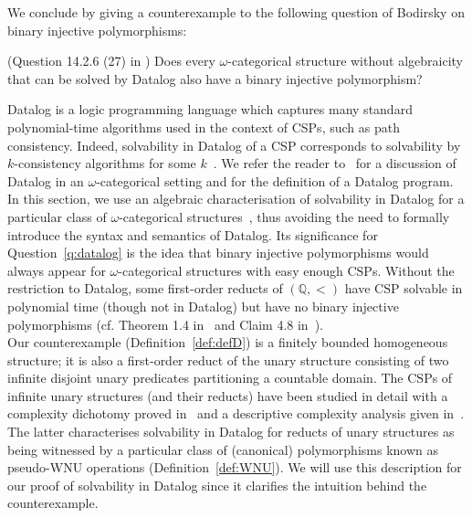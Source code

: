 \documentclass{article}
\theoremstyle{remark}
\theoremstyle{definition}
\newenvironment{customq}[1]
  {\renewcommand\theinnercustomq{#1}\innercustomq}
  {\endinnercustomq}
\begin{document}
We conclude by giving a counterexample to the following question of Bodirsky on binary injective polymorphisms:

\begin{customq}{\ref{q:datalog}}(Question 14.2.6 (27) in {\cite{BodCSP}})
   Does every $\omega$-categorical structure without algebraicity that can be solved
by Datalog also have a binary injective polymorphism?
\end{customq}

  Datalog is a logic programming language which captures many standard polynomial-time algorithms used in the context of CSPs, such as path consistency. Indeed, solvability in Datalog of a CSP corresponds to solvability by $k$-consistency algorithms for some $k$~\cite{feder1998computational, bodirsky2013datalog}. We refer the reader to~\cite{bodirsky2013datalog} for a discussion of Datalog in an $\omega$-categorical setting and for the definition of a Datalog program. In this section, we use an algebraic characterisation of solvability in Datalog for a particular class of $\omega$-categorical structures~\cite{mottet2021symmetries}, thus avoiding the need to formally introduce the syntax and semantics of Datalog. Its significance for Question~\ref{q:datalog} is the idea that binary injective polymorphisms would always appear for $\omega$-categorical structures with easy enough $\mathrm{CSP}$s. Without the restriction to Datalog, some first-order reducts of $(\mathbb{Q}, <)$ have $\mathrm{CSP}$ solvable in polynomial time (though not in Datalog) but have no binary injective polymorphisms (cf. Theorem 1.4 in~\cite{bodirsky2022tractable} and Claim 4.8 in~\cite{bodirsky2022descriptive}).\\

Our counterexample (Definition~\ref{def:defD}) is a finitely bounded homogeneous structure; it is also %
 a first-order reduct of the unary structure consisting of two infinite disjoint unary predicates partitioning a countable domain. The $\mathrm{CSP}$s of infinite unary structures (and their reducts) have been studied in detail with a complexity dichotomy proved in~\cite[Theorems 1.1 \& 1.2]{bodirsky2018dichotomy} and a descriptive complexity analysis given in~\cite[Theorem 5.1]{mottet2021symmetries}. The latter characterises solvability in Datalog for reducts of unary structures as being witnessed by a particular class of (canonical) polymorphisms known as pseudo-WNU operations (Definition~\ref{def:WNU}). We will use this description for our proof of solvability in Datalog since it clarifies the intuition behind the counterexample.\\ %
\end{document}
